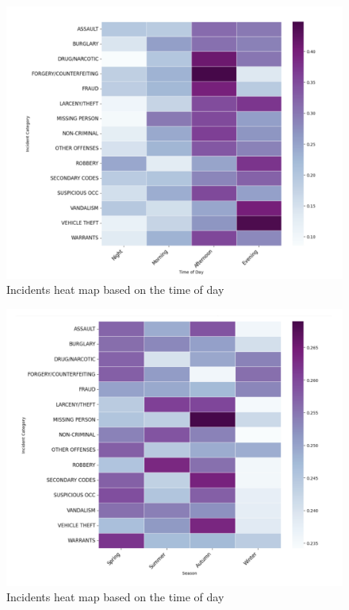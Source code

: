 \documentclass[11 pt,conference,final,]{IEEEtran}
\begin{document}
\begin{figure}

{\centering \includegraphics[width=0.9\linewidth]{img/fig6} 

}

\caption{Incidents heat map based on the time of day}\label{fig:unnamed-chunk-6}
\end{figure}

\begin{figure}

{\centering \includegraphics[width=0.9\linewidth]{img/fig7} 

}

\caption{Incidents heat map based on the time of day}\label{fig:unnamed-chunk-7}
\end{figure}
\end{document}

